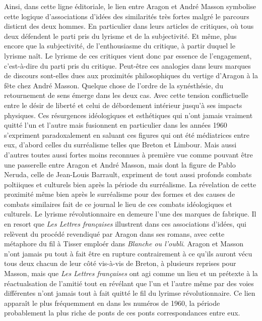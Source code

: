 Ainsi, dans cette ligne éditoriale, le lien entre Aragon et André Masson symbolise cette logique d'associations d'idées des similarités très fortes malgré le parcours disticnt des deux hommes. En particulier dans leurs articles de critiques, où tous deux défendent le parti pris du lyrisme et de la subjectivité. Et même, plus encore que la subjectivité, de l'enthousiasme du critique, à partir duquel le lyrisme naît. Le lyrisme de ces critiques vient donc par essence de l'engagement, c'est-à-dire du parti pris du critique. Peut-être ces analogies dans leurs marques de discours sont-elles dues aux proximités philosophiques du vertige d'Aragon à la fête chez André Masson. Quelque chose de l'ordre de la synésthésie, du retournement de sens émerge dans les deux cas. Avec cette tension conflictuelle entre le désir de liberté et celui de débordement intérieur jusqu'à ses impacts physiques. Ces résurgences idéologiques et esthétiques qui n'ont jamais vraiment quitté l'un et l'autre mais fusionnent en particulier dans les années 1960 s'expriment paradoxalement en saluant ces figures qui ont été médiatrices entre eux, d'abord celles du surréalisme telles que Breton et Limbour. Mais aussi d'autres toutes aussi fortes moins reconnues à première vue comme pouvant être une passerelle entre Aragon et André Masson, mais dont la figure de Pablo Neruda, celle de Jean-Louis Barrault, expriment de tout aussi profonds combats poltiiques et culturels bien après la période du surréalisme. La révelation de cette proximité même bien après le surréalisme pour des formes et des causes de combats similaires  fait de ce journal le lieu de ces combats idéologiques et culturels. Le lyrisme révolutionnaire en demeure l'une des marques de fabrique. Il en resort que \emph{Les Lettres françaises} illustrent dans ces associations d'idées, qui relèvent du procédé revendiqué par Aragon dans ses romans, avec cette métaphore du fil à Tisser emploér dans \emph{Blanche ou l'oubli}. Aragon et Masson n'ont jamais pu tout à fait être en rupture contrairement à ce qu'ils auront vécu tous deux chacun de leur côté vis-à-vis de Breton, à plusieurs reprises pour Masson, mais que \emph{Les Lettres françaises} ont agi comme un lieu et un prétexte à la réactualsation de l'amitié  tout en révélant que l'un et l'autre même par des voies différentes n'ont jamais tout à fait quitté le fil du lyrimse révolutionnaire. Ce lien apparaît le plus fréquemment en dans les numéros de 1960, la période probablement la plus riche de ponts de ces ponts correspondances entre eux. 


